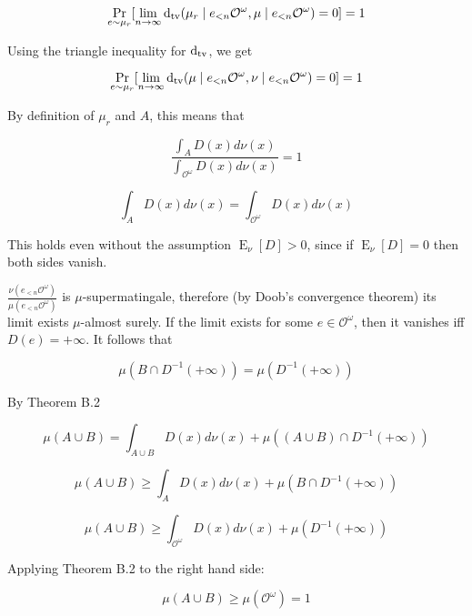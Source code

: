 \documentclass[a4paper]{article}
\DeclareMathOperator{\Prb}{Pr}
\DeclareMathOperator{\E}{E}
\newcommand{\Dtv}{\operatorname{d}_{\textnormal{tv}}}
\newcommand{\Obs}{\mathcal{O}}
\newcommand{\ObsO}{\Obs^\omega}
\begin{document}
$$\Prb_{e \sim \mu_r}[\lim_{n \rightarrow \infty} \Dtv(\mu_r \mid e_{<n}\ObsO, \mu \mid e_{<n}\ObsO) = 0] = 1$$

Using the triangle inequality for ${\Dtv}$, we get

$$\Prb_{e \sim \mu_r}[\lim_{n \rightarrow \infty} \Dtv(\mu \mid e_{<n}\ObsO, \nu \mid e_{<n}\ObsO) = 0] = 1$$

By definition of ${\mu_r}$ and ${A}$, this means that

$$\frac{\int_{A} D(x) d\nu(x)}{\int_{\ObsO} D(x) d\nu(x)} = 1$$

$$\int_{A} D(x) d\nu(x) = \int_{\ObsO} D(x) d\nu(x)$$

This holds even without the assumption ${\E_\nu[D] > 0}$, since if ${\E_\nu[D] = 0}$ then both sides vanish.

${\frac{\nu(e_{<n}\ObsO)}{\mu(e_{<n}\ObsO)}}$ is ${\mu}$-supermatingale, therefore (by Doob's convergence theorem) its limit exists ${\mu}$-almost surely. If the limit exists for some ${e \in \ObsO}$, then it vanishes iff ${D(e)=+\infty}$. It follows that

$$\mu(B \cap D^{-1}(+\infty)) = \mu(D^{-1}(+\infty))$$

By Theorem B.2

$$\mu(A \cup B) = \int_{A \cup B} D(x) d\nu(x) + \mu((A \cup B) \cap D^{-1}(+\infty))$$

$$\mu(A \cup B) \geq \int_{A} D(x) d\nu(x) + \mu(B \cap D^{-1}(+\infty))$$

$$\mu(A \cup B) \geq \int_{\ObsO} D(x) d\nu(x) + \mu(D^{-1}(+\infty))$$

Applying Theorem B.2 to the right hand side:

$$\mu(A \cup B) \geq \mu(\ObsO) = 1$$
\end{document}
